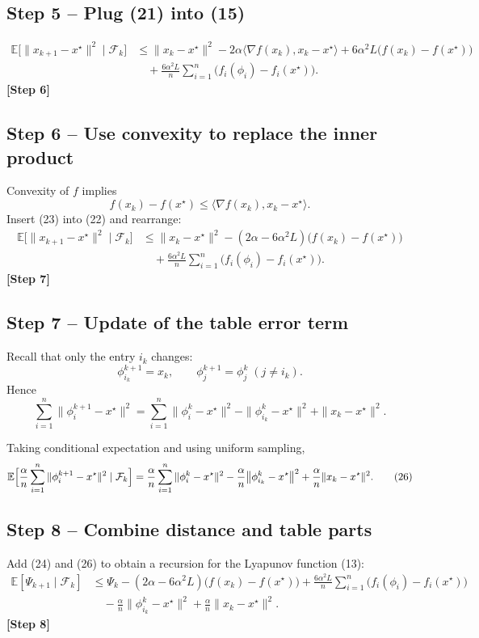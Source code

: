 \documentclass{article}
\newcommand{\E}{\mathbb{E}}
\begin{document}
\subsection*{Step 5 – Plug (21) into (15)}
\begin{align}
\E\bigl[\|x_{k+1}-x^\star\|^2\mid\mathcal F_k\bigr]
&\le \|x_k-x^\star\|^2-2\alpha\langle\nabla f(x_k),x_k-x^\star\rangle
+6\alpha^2L\bigl(f(x_k)-f(x^\star)\bigr) \nonumber\\
&\quad+\frac{6\alpha^2L}{n}\sum_{i=1}^{n}\bigl(f_i(\phi_i)-f_i(x^\star)\bigr).
\tag{22}
\end{align}
\textbf{[Step 6]}

\subsection*{Step 6 – Use convexity to replace the inner product}
Convexity of $f$ implies
\[
f(x_k)-f(x^\star)\le\langle\nabla f(x_k),x_k-x^\star\rangle.
\tag{23}
\]
Insert (23) into (22) and rearrange:
\begin{align}
\E\bigl[\|x_{k+1}-x^\star\|^2\mid\mathcal F_k\bigr]
&\le \|x_k-x^\star\|^2-(2\alpha-6\alpha^2L)\bigl(f(x_k)-f(x^\star)\bigr) \nonumber\\
&\quad+\frac{6\alpha^2L}{n}\sum_{i=1}^{n}\bigl(f_i(\phi_i)-f_i(x^\star)\bigr).
\tag{24}
\end{align}
\textbf{[Step 7]}

\subsection*{Step 7 – Update of the table error term}
Recall that only the entry $i_k$ changes:
\[
\phi_{i_k}^{k+1}=x_k,\qquad\phi_j^{k+1}=\phi_j^{k}\;(j\neq i_k).
\]
Hence
\[
\sum_{i=1}^{n}\|\phi_i^{k+1}-x^\star\|^2
= \sum_{i=1}^{n}\|\phi_i^{k}-x^\star\|^2
- \|\phi_{i_k}^{k}-x^\star\|^2 +\|x_k-x^\star\|^2.
\tag{25}
\]

Taking conditional expectation and using uniform sampling,
\[
\E\Bigl[\frac{\alpha}{n}\sum_{i=1}^{n}\|\phi_i^{k+1}-x^\star\|^2\mid\mathcal F_k\Bigr]
= \frac{\alpha}{n}\sum_{i=1}^{n}\|\phi_i^{k}-x^\star\|^2
-\frac{\alpha}{n}\bigl\|\phi_{i_k}^{k}-x^\star\bigr\|^2
+\frac{\alpha}{n}\|x_k-x^\star\|^2.
\tag{26}
\]

\subsection*{Step 8 – Combine distance and table parts}
Add (24) and (26) to obtain a recursion for the Lyapunov function (13):
\begin{align}
\E[\Psi_{k+1}\mid\mathcal F_k]
&\le \Psi_k-(2\alpha-6\alpha^2L)\bigl(f(x_k)-f(x^\star)\bigr)
+\frac{6\alpha^2L}{n}\sum_{i=1}^{n}\bigl(f_i(\phi_i)-f_i(x^\star)\bigr)
\nonumber\\
&\quad -\frac{\alpha}{n}\bigl\|\phi_{i_k}^{k}-x^\star\bigr\|^2
+\frac{\alpha}{n}\|x_k-x^\star\|^2.
\tag{27}
\end{align}
\textbf{[Step 8]}
\end{document}
